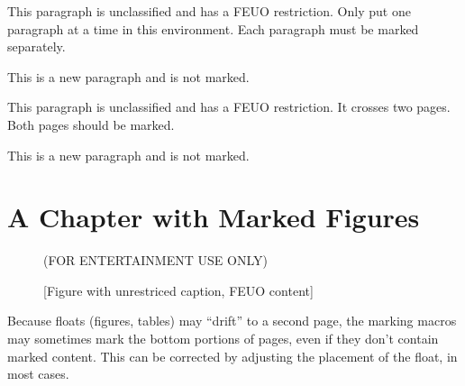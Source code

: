 \begin{smark}[(FEUO)]
This paragraph is unclassified and has a FEUO restriction.
Only put one paragraph at a time in this environment.
Each paragraph must be marked separately.
\lipsum[2]
\end{smark}

This is a new paragraph and is not marked.
\lipsum[3]

\newpage
\lipsum[1-3]

\begin{smark}[(FEUO)]
This paragraph is unclassified and has a FEUO restriction.
It crosses two pages. Both pages should be marked.
\lipsum[4]
\end{smark}

This is a new paragraph and is not marked.
\lipsum[3]

\newpage
\section{A Chapter with Marked Figures}
\lipsum[1-4]

\begin{figure}
\begin{smarkenv}{(FOR ENTERTAINMENT USE ONLY)}
\framebox[\textwidth]{\parbox{\textwidth}{\lipsum[1]}}
\end{smarkenv}
\caption{[Figure with unrestriced caption, FEUO content]}
\end{figure}

Because floats (figures, tables) may ``drift'' to a second
page, the marking macros may sometimes mark the bottom portions
of pages, even if they don't contain marked content. This can
be corrected by adjusting the placement of the float, in most
cases.